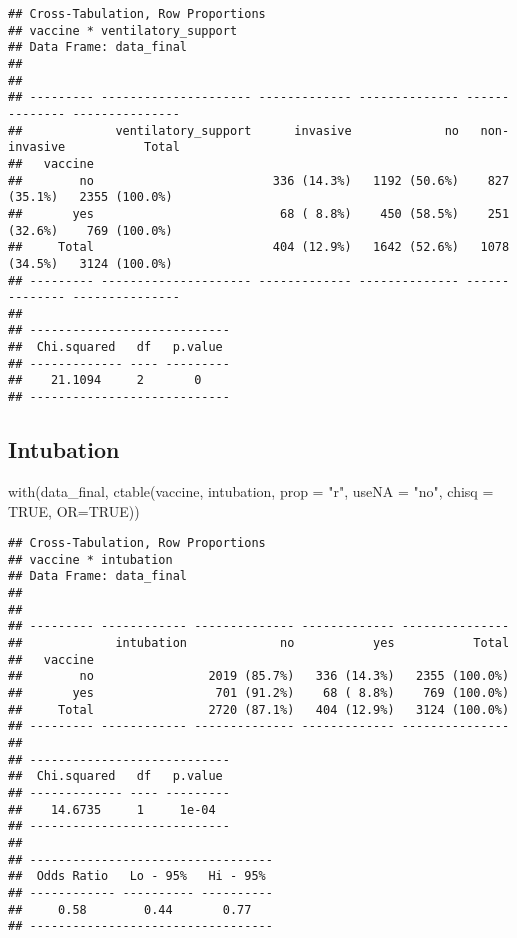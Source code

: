 \documentclass[
]{article}
\newenvironment{Shaded}{\begin{snugshade}}{\end{snugshade}}
\newcommand{\AttributeTok}[1]{\textcolor[rgb]{0.77,0.63,0.00}{#1}}
\newcommand{\ConstantTok}[1]{\textcolor[rgb]{0.00,0.00,0.00}{#1}}
\newcommand{\FunctionTok}[1]{\textcolor[rgb]{0.00,0.00,0.00}{#1}}
\newcommand{\NormalTok}[1]{#1}
\newcommand{\StringTok}[1]{\textcolor[rgb]{0.31,0.60,0.02}{#1}}
\begin{document}
\begin{verbatim}
## Cross-Tabulation, Row Proportions  
## vaccine * ventilatory_support  
## Data Frame: data_final  
## 
## 
## --------- --------------------- ------------- -------------- -------------- ---------------
##             ventilatory_support      invasive             no   non-invasive           Total
##   vaccine                                                                                  
##        no                         336 (14.3%)   1192 (50.6%)    827 (35.1%)   2355 (100.0%)
##       yes                          68 ( 8.8%)    450 (58.5%)    251 (32.6%)    769 (100.0%)
##     Total                         404 (12.9%)   1642 (52.6%)   1078 (34.5%)   3124 (100.0%)
## --------- --------------------- ------------- -------------- -------------- ---------------
## 
## ----------------------------
##  Chi.squared   df   p.value 
## ------------- ---- ---------
##    21.1094     2       0    
## ----------------------------
\end{verbatim}

\hypertarget{intubation}{%
\subsection{Intubation}\label{intubation}}

\begin{Shaded}
\begin{Highlighting}[]
\FunctionTok{with}\NormalTok{(data\_final, }\FunctionTok{ctable}\NormalTok{(vaccine, intubation, }\AttributeTok{prop =} \StringTok{"r"}\NormalTok{, }\AttributeTok{useNA =} \StringTok{"no"}\NormalTok{, }\AttributeTok{chisq =} \ConstantTok{TRUE}\NormalTok{, }\AttributeTok{OR=}\ConstantTok{TRUE}\NormalTok{))}
\end{Highlighting}
\end{Shaded}

\begin{verbatim}
## Cross-Tabulation, Row Proportions  
## vaccine * intubation  
## Data Frame: data_final  
## 
## 
## --------- ------------ -------------- ------------- ---------------
##             intubation             no           yes           Total
##   vaccine                                                          
##        no                2019 (85.7%)   336 (14.3%)   2355 (100.0%)
##       yes                 701 (91.2%)    68 ( 8.8%)    769 (100.0%)
##     Total                2720 (87.1%)   404 (12.9%)   3124 (100.0%)
## --------- ------------ -------------- ------------- ---------------
## 
## ----------------------------
##  Chi.squared   df   p.value 
## ------------- ---- ---------
##    14.6735     1     1e-04  
## ----------------------------
## 
## ----------------------------------
##  Odds Ratio   Lo - 95%   Hi - 95% 
## ------------ ---------- ----------
##     0.58        0.44       0.77   
## ----------------------------------
\end{verbatim}
\end{document}
